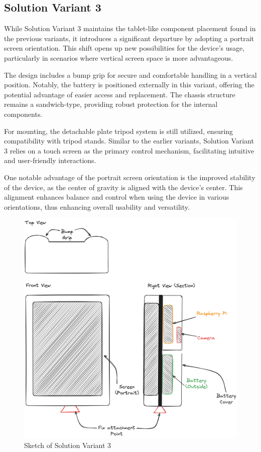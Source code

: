 \subsection{Solution Variant 3}
While Solution Variant 3 maintains the tablet-like component placement found in the previous variants, it introduces a significant departure by adopting a portrait screen orientation. This shift opens up new possibilities for the device's usage, particularly in scenarios where vertical screen space is more advantageous.

The design includes a bump grip for secure and comfortable handling in a vertical position. Notably, the battery is positioned externally in this variant, offering the potential advantage of easier access and replacement. The chassis structure remains a sandwich-type, providing robust protection for the internal components.

For mounting, the detachable plate tripod system is still utilized, ensuring compatibility with tripod stands. Similar to the earlier variants, Solution Variant 3 relies on a touch screen as the primary control mechanism, facilitating intuitive and user-friendly interactions.

One notable advantage of the portrait screen orientation is the improved stability of the device, as the center of gravity is aligned with the device's center. This alignment enhances balance and control when using the device in various orientations, thus enhancing overall usability and versatility.

\begin{figure}[H]
    \centering
    \includegraphics[width=\linewidth]{texs/Part1/chapter3/image/v3.png}
    \caption{Sketch of Solution Variant 3}
    \label{fig:sketch-solution-variant-3}
\end{figure}

